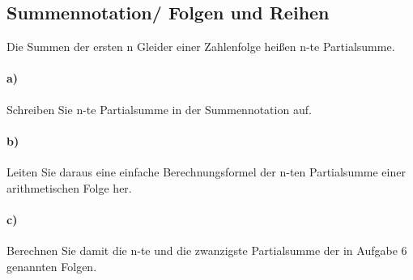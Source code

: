 \documentclass[paper=a4, fontsize=11pt]{scrartcl}
\numberwithin{equation}{section}
\numberwithin{figure}{section}
\numberwithin{table}{section}
\begin{document}
\subsection{Summennotation/ Folgen und Reihen}
Die Summen der ersten n Gleider einer Zahlenfolge heißen n-te Partialsumme.
\paragraph{a)}
Schreiben Sie n-te Partialsumme in der Summennotation auf.

\paragraph{b)}
Leiten Sie daraus eine einfache Berechnungsformel der n-ten Partialsumme einer arithmetischen Folge her.

\paragraph{c)}
Berechnen Sie damit die n-te und die zwanzigste Partialsumme der in Aufgabe 6 genannten Folgen.

\end{document}
